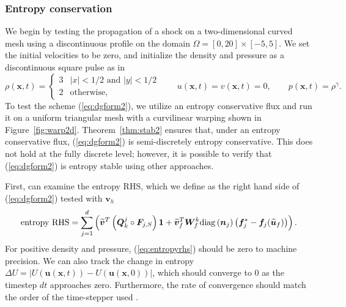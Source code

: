 \documentclass[10pt]{amsart}
\theoremstyle{definition}
\theoremstyle{lemma}
\theoremstyle{theorem}
\theoremstyle{assumption}
\renewcommand{\tilde}{\widetilde}
\newcommand{\LRp}[1]{\left( #1 \right)}
\newcommand{\LRb}[1]{\left| #1 \right|}
\newcommand{\diag}[1]{{\rm diag}\LRp{#1}}
\begin{document}
{\subsubsection{Entropy conservation}

We begin by testing the propagation of a shock on a two-dimensional curved mesh using a discontinuous profile on the domain $\Omega = [0,20] \times [-5,5]$.   We set the initial velocities to be zero, and initialize the density and pressure as a discontinuous square pulse as in \cite{chan2017discretely}
\begin{equation}
\rho(\bm{x},t) = \begin{cases}
3 & \LRb{x} < 1/2 \text{ and } \LRb{y} < 1/2\\
2 & \text{otherwise},
\end{cases} \qquad 
u(\bm{x},t) = v(\bm{x},t) = 0, \qquad
p(\bm{x},t) = \rho^\gamma.
\label{eq:discontin}
\end{equation}
To test the scheme (\ref{eq:dgform2}), we utilize an entropy conservative flux and run it on a uniform triangular mesh with a curvilinear warping shown in Figure~\ref{fig:warp2d}.   Theorem~\ref{thm:stab2} ensures that, under an entropy conservative flux, (\ref{eq:dgform2}) is semi-discretely entropy conservative.  This does not hold at the fully discrete level; however, it is possible to verify that (\ref{eq:dgform2}) is entropy stable using other approaches.  

First, can examine the entropy RHS, which we define as the right hand side of (\ref{eq:dgform2}) tested with $\bm{v}_h$ 
\begin{equation}
  \text{entropy RHS}= \sum_{j=1}^d\LRp{ \tilde{\bm{v}}^T\LRp{\bm{Q}^j_k \circ \bm{F}_{j,S}}\bm{1} + \tilde{\bm{v}}_f^T\bm{W}_f^k \diag{\bm{n}_j}\LRp{\bm{f}_j^* - \bm{f}_j(\tilde{\bm{u}}_f)}}.  
\label{eq:entropyrhs}
\end{equation}
For positive density and pressure, (\ref{eq:entropyrhs}) should be zero to machine precision.  We can also track the change in entropy $\Delta U = \LRb{U(\bm{u}(\bm{x},t))-U(\bm{u}(\bm{x},0))}$, which should converge to $0$ as the timestep $dt$ approaches zero.  Furthermore, the rate of convergence should match the order of the time-stepper used \cite{gassner2016well, chan2017discretely}.  

}
\end{document}
